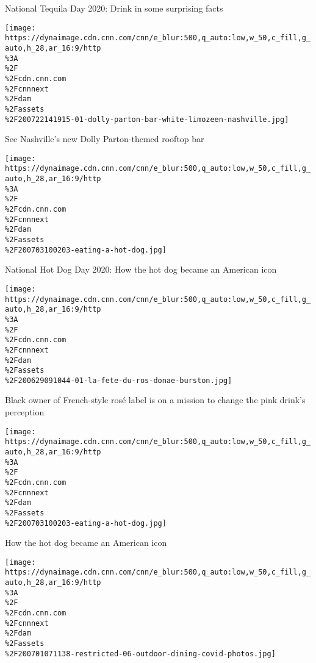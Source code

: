 National Tequila Day 2020: Drink in some surprising facts

\href{/travel/article/dolly-parton-bar-white-limozeen-nashville/index.html}{}

\texttt{[image: https://dynaimage.cdn.cnn.com/cnn/e\_blur:500,q\_auto:low,w\_50,c\_fill,g\_auto,h\_28,ar\_16:9/http\\\%3A\\\%2F\\\%2Fcdn.cnn.com\\\%2Fcnnnext\\\%2Fdam\\\%2Fassets\\\%2F200722141915-01-dolly-parton-bar-white-limozeen-nashville.jpg]}

\href{/travel/article/dolly-parton-bar-white-limozeen-nashville/index.html}{}

See Nashville's new Dolly Parton-themed rooftop bar

\href{/travel/article/national-hot-dog-day-2020/index.html}{}

\texttt{[image: https://dynaimage.cdn.cnn.com/cnn/e\_blur:500,q\_auto:low,w\_50,c\_fill,g\_auto,h\_28,ar\_16:9/http\\\%3A\\\%2F\\\%2Fcdn.cnn.com\\\%2Fcnnnext\\\%2Fdam\\\%2Fassets\\\%2F200703100203-eating-a-hot-dog.jpg]}

\href{/travel/article/national-hot-dog-day-2020/index.html}{}

National Hot Dog Day 2020: How the hot dog became an American icon

\href{/travel/article/black-rose-label-la-fete-du-ros/index.html}{}

\texttt{[image: https://dynaimage.cdn.cnn.com/cnn/e\_blur:500,q\_auto:low,w\_50,c\_fill,g\_auto,h\_28,ar\_16:9/http\\\%3A\\\%2F\\\%2Fcdn.cnn.com\\\%2Fcnnnext\\\%2Fdam\\\%2Fassets\\\%2F200629091044-01-la-fete-du-ros-donae-burston.jpg]}

\href{/travel/article/black-rose-label-la-fete-du-ros/index.html}{}

Black owner of French-style rosé label is on a mission to change the
pink drink's perception

\href{/travel/article/hot-dog-classic-american-summer-food/index.html}{}

\texttt{[image: https://dynaimage.cdn.cnn.com/cnn/e\_blur:500,q\_auto:low,w\_50,c\_fill,g\_auto,h\_28,ar\_16:9/http\\\%3A\\\%2F\\\%2Fcdn.cnn.com\\\%2Fcnnnext\\\%2Fdam\\\%2Fassets\\\%2F200703100203-eating-a-hot-dog.jpg]}

\href{/travel/article/hot-dog-classic-american-summer-food/index.html}{}

How the hot dog became an American icon

\href{/travel/article/outdoor-dining-united-states-covid-19/index.html}{}

\texttt{[image: https://dynaimage.cdn.cnn.com/cnn/e\_blur:500,q\_auto:low,w\_50,c\_fill,g\_auto,h\_28,ar\_16:9/http\\\%3A\\\%2F\\\%2Fcdn.cnn.com\\\%2Fcnnnext\\\%2Fdam\\\%2Fassets\\\%2F200701071138-restricted-06-outdoor-dining-covid-photos.jpg]}

